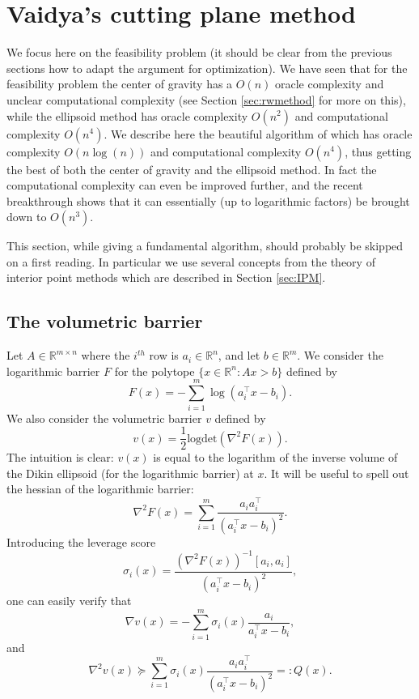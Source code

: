 \documentclass[openany]{now}
\begin{document}
\section{Vaidya's cutting plane method}
We focus here on the feasibility problem (it should be clear from the previous sections how to adapt the argument for optimization). We have seen that for the feasibility problem the center of gravity has a $O(n)$ oracle complexity and unclear computational complexity (see Section \ref{sec:rwmethod} for more on this), while the ellipsoid method has oracle complexity $O(n^2)$ and computational complexity $O(n^4)$. We describe here the beautiful algorithm of \cite{Vai89, Vai96} which has oracle complexity $O(n \log(n))$ and computational complexity $O(n^4)$, thus getting the best of both the center of gravity and the ellipsoid method. In fact the computational complexity can even be improved further, and the recent breakthrough \cite{LSW15} shows that it can essentially (up to logarithmic factors) be brought down to $O(n^3)$.

This section, while giving a fundamental algorithm, should probably be skipped on a first reading. In particular we use several concepts from the theory of interior point methods which are described in Section \ref{sec:IPM}.

\subsection{The volumetric barrier}
Let $A \in \mathbb{R}^{m \times n}$ where the $i^{th}$ row is $a_i \in \mathbb{R}^n$, and let $b \in \mathbb{R}^m$. We consider the logarithmic barrier $F$ for the polytope $\{x \in \mathbb{R}^n : A x > b\}$ defined by
$$F(x) = - \sum_{i=1}^m \log(a_i^{\top} x - b_i) .$$
We also consider the volumetric barrier $v$ defined by
$$v(x) = \frac{1}{2} \mathrm{logdet}(\nabla^2 F(x) ) .$$
The intuition is clear: $v(x)$ is equal to the logarithm of the inverse volume of the Dikin ellipsoid (for the logarithmic barrier) at $x$. It will be useful to spell out the hessian of the logarithmic barrier:
$$\nabla^2 F(x) = \sum_{i=1}^m \frac{a_i a_i^{\top}}{(a_i^{\top} x - b_i)^2} .$$
Introducing the leverage score
$$\sigma_i(x) = \frac{(\nabla^2 F(x) )^{-1}[a_i, a_i]}{(a_i^{\top} x - b_i)^2} ,$$
one can easily verify that
\begin{equation} \label{eq:gradvol}
\nabla v(x) = - \sum_{i=1}^m \sigma_i(x) \frac{a_i}{a_i^{\top} x - b_i} ,
\end{equation}
and 
\begin{equation} \label{eq:hessianvol}
\nabla^2 v(x) \succeq \sum_{i=1}^m \sigma_i(x) \frac{a_i a_i^{\top}}{(a_i^{\top} x - b_i)^2} =: Q(x) .
\end{equation}
\end{document}
